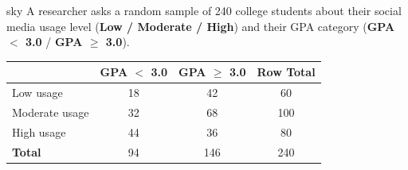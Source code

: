 \documentclass[10pt]{article}
\begin{document}
\namepartnerperiod

\vspace{0.08in}

\begin{scenariobox}{sky}
A researcher asks a random sample of 240 college students about their social media
usage level (\textbf{Low / Moderate / High}) and their GPA category
(\textbf{GPA $<$ 3.0} / \textbf{GPA $\ge$ 3.0}).

\renewcommand{\arraystretch}{1.4}
\begin{center}
\begin{tabular}{@{} l c c c @{}}
\hline
                 & \textbf{GPA $<$ 3.0} & \textbf{GPA $\ge$ 3.0} & \textbf{Row Total} \\
\hline
Low usage        & 18  & 42  & 60  \\
Moderate usage   & 32  & 68  & 100 \\
High usage       & 44  & 36  & 80  \\
\hline
\textbf{Total}   & 94  & 146 & 240 \\
\hline
\end{tabular}
\end{center}
\end{scenariobox}

\vspace{0.04in}
\end{document}
